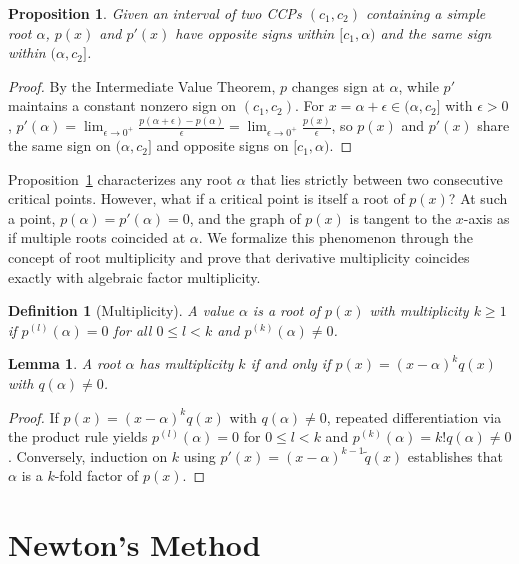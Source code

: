 \documentclass{amsart}
\newtheorem{lemma}{Lemma}
\newtheorem{define}{Definition}
\newtheorem{proposition}{Proposition}
\begin{document}
\begin{proposition}\label{prop_sign}
    Given an interval of two CCPs $(c_1, c_2)$ containing a simple root $\alpha$, $p(x)$ and $p'(x)$ have opposite signs within $[c_1, \alpha)$ and the same sign within $(\alpha, c_2]$.
\end{proposition}
\begin{proof}
    By the Intermediate Value Theorem, $p$ changes sign at $\alpha$, while $p'$ maintains a constant nonzero sign on $(c_1, c_2)$. For $x = \alpha + \epsilon \in (\alpha, c_2]$ with $\epsilon > 0$, $p'(\alpha) = \lim_{\epsilon \to 0^+} \frac{p(\alpha+\epsilon) - p(\alpha)}{\epsilon} = \lim_{\epsilon \to 0^+} \frac{p(x)}{\epsilon}$, so $p(x)$ and $p'(x)$ share the same sign on $(\alpha, c_2]$ and opposite signs on $[c_1, \alpha)$.
\end{proof}

Proposition~\ref{prop_sign} characterizes any root $\alpha$ that lies strictly between two consecutive critical points. However, what if a critical point is itself a root of $p(x)$? At such a point, $p(\alpha) = p'(\alpha) = 0$, and the graph of $p(x)$ is tangent to the $x$-axis as if multiple roots coincided at $\alpha$. We formalize this phenomenon through the concept of root multiplicity and prove that derivative multiplicity coincides exactly with algebraic factor multiplicity.

\begin{define}[Multiplicity]
    A value $\alpha$ is a root of $p(x)$ with multiplicity $k \geq 1$ if $p^{(l)}(\alpha) = 0$ for all $0 \leq l < k$ and $p^{(k)}(\alpha) \neq 0$.
\end{define}

\begin{lemma}\label{lemma_rep}
    A root $\alpha$ has multiplicity $k$ if and only if $p(x) = (x-\alpha)^k q(x)$ with $q(\alpha) \neq 0$.
\end{lemma}
\begin{proof}
    If $p(x) = (x-\alpha)^k q(x)$ with $q(\alpha) \neq 0$, repeated differentiation via the product rule yields $p^{(l)}(\alpha) = 0$ for $0 \leq l < k$ and $p^{(k)}(\alpha) = k! q(\alpha) \neq 0$. Conversely, induction on $k$ using $p'(x) = (x-\alpha)^{k-1} \tilde{q}(x)$ establishes that $\alpha$ is a $k$-fold factor of $p(x)$.
\end{proof}

\section{Newton's Method}\label{sec_newt}
\end{document}
